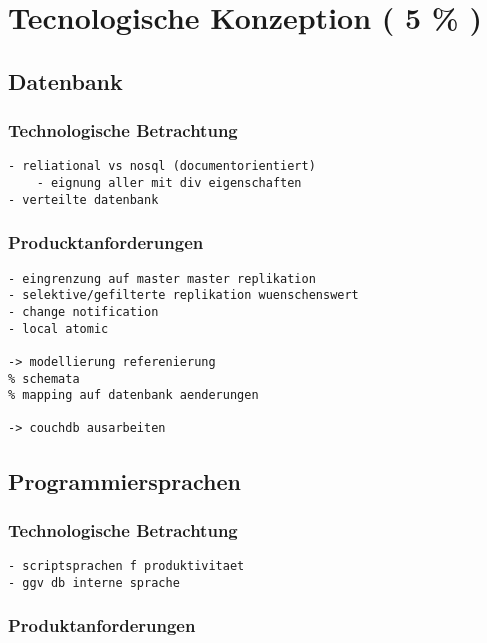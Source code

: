 \chapter{Tecnologische Konzeption ( 5 \% )}





\section{Datenbank}
\subsection{Technologische Betrachtung}

\begin{verbatim}
- reliational vs nosql (documentorientiert)
    - eignung aller mit div eigenschaften
- verteilte datenbank
\end{verbatim}


\subsection{Producktanforderungen}

\begin{verbatim}
- eingrenzung auf master master replikation
- selektive/gefilterte replikation wuenschenswert
- change notification
- local atomic

-> modellierung referenierung
% schemata
% mapping auf datenbank aenderungen

-> couchdb ausarbeiten

\end{verbatim}


\section{Programmiersprachen}
\subsection{Technologische Betrachtung}

\begin{verbatim}
- scriptsprachen f produktivitaet
- ggv db interne sprache
\end{verbatim}

\subsection{Produktanforderungen}

